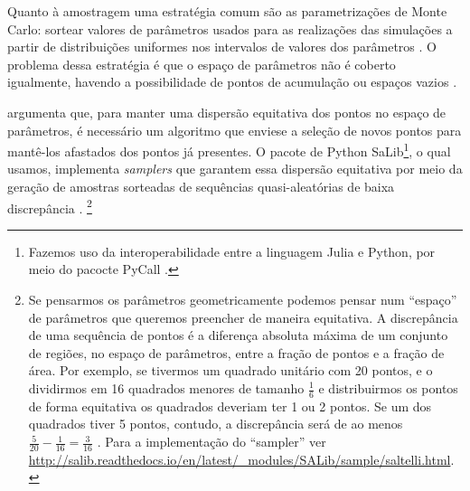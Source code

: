Quanto à amostragem uma estratégia comum são as parametrizações de Monte Carlo:
sortear valores de parâmetros usados para as realizações das simulações a partir
de distribuições uniformes nos intervalos de valores dos parâmetros
\cite{laver2011party}. O problema dessa estratégia é que o espaço de parâmetros
não é coberto igualmente, havendo a possibilidade de pontos de acumulação ou
espaços vazios \cite{pereda2017brief}.

 argumenta que, para manter uma dispersão
equitativa dos pontos no espaço de parâmetros, é necessário um algoritmo que
enviese a seleção de novos pontos para mantê-los afastados dos pontos já
presentes. O pacote de Python SaLib\footnote{Fazemos uso da interoperabilidade
  entre a linguagem Julia e Python, por meio do pacocte PyCall
  \cite{johnson2018}.}, o qual usamos, implementa \textit{samplers} que garantem essa
dispersão equitativa por meio da geração de amostras sorteadas de sequências
quasi-aleatórias de baixa discrepância \cite{herman2017salib}. \footnote{ Se
  pensarmos os parâmetros geometricamente podemos pensar num ``espaço'' de
  parâmetros que queremos preencher de maneira equitativa. A discrepância de uma
  sequência de pontos é a diferença absoluta máxima de um conjunto de regiões,
  no espaço de parâmetros, entre a fração de pontos e a fração de área. Por
  exemplo, se tivermos um quadrado unitário com 20 pontos, e o dividirmos em 16
  quadrados menores de tamanho \(\frac{1}{6}\) e distribuirmos os pontos de
  forma equitativa os quadrados deveriam ter 1 ou 2 pontos. Se um dos quadrados
  tiver 5 pontos, contudo, a discrepância será de ao menos \(\frac{5}{20} -
  \frac{1}{16} = \frac{3}{16}\) \cite[p.83]{saltelli2008global}. Para a
  implementação do ``sampler'' ver
  \url{http://salib.readthedocs.io/en/latest/_modules/SALib/sample/saltelli.html}.}

